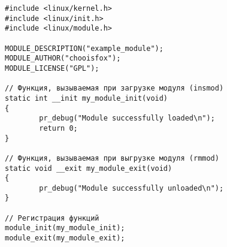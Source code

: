 \begin{verbatim}
#include <linux/kernel.h>
#include <linux/init.h>
#include <linux/module.h>

MODULE_DESCRIPTION("example_module");
MODULE_AUTHOR("chooisfox");
MODULE_LICENSE("GPL");

// Функция, вызываемая при загрузке модуля (insmod)
static int __init my_module_init(void)
{
        pr_debug("Module successfully loaded\n");
        return 0;
}

// Функция, вызываемая при выгрузке модуля (rmmod)
static void __exit my_module_exit(void)
{
        pr_debug("Module successfully unloaded\n");
}

// Регистрация функций
module_init(my_module_init);
module_exit(my_module_exit);
\end{verbatim}
